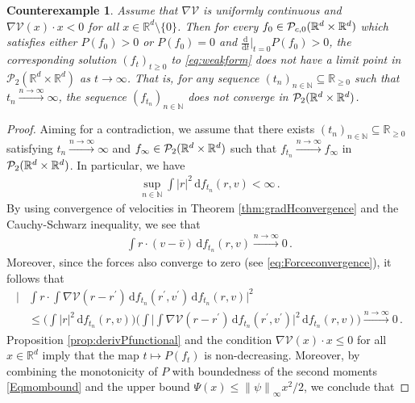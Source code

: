 \documentclass[11pt]{article}
\newtheorem*{counterexample*}{Counterexample}
\newcommand{\R}[0]{\mathbb R}
\newcommand{\N}[0]{\mathbb N}
\newcommand{\norm}[1]{\left\| #1 \right\|}
\newcommand{\abs}[1]{\left| #1 \right|}
\newcommand{\Ppo}[1]{
    \ifx #1\infty
        \mathcal{P}_{c,0}
    \else 
        \mathcal{P}_{#1,0}
    \fi 
}
\newcommand{\Pp}[1]{
    \ifx #1\infty
        \mathcal{P}_{c}
    \else 
        \mathcal{P}_{#1}
    \fi 
}
\newcommand{\msolt}[2]{f_{#1}(#2)}
\newcommand{\Pfunc}{P}
\begin{document}
\begin{bibunit}[unsrtnat]
\begin{counterexample*}
        Assume that $\nabla \mathcal{V}$ is uniformly continuous and $\nabla \mathcal{V}(x) \cdot x < 0$ for all $x \in \R^d\setminus\{ 0 \}$. Then for every $f_0 \in \Ppo{\infty} (\R^d \times \R^d)$ which satisfies either $P(f_0) > 0$ or $P(f_0) = 0$ and $\frac{\mathrm{d}}{\mathrm{d}t} \Big|_{t = 0} P(f_0) > 0$, the corresponding solution $(f_t )_{t \geq 0}$ to \eqref{eq:weakform} does not have a limit point in $\mathcal{P}_2(\R^d \times \R^d)$ as $t \to \infty$. That is, for any sequence $(t_n)_{n \in \N} \subseteq \R_{\geq 0} $ such that $t_n \stackrel{n \to \infty}{\to} \infty$, the sequence $(f_{t_n})_{n \in \N}$ does not converge in $\Pp{2}(\R^d \times \R^d)$.
    \end{counterexample*}
    \begin{proof}
        Aiming for a contradiction, we assume that there exists $(t_n)_{n \in \N} \subseteq \R_{\geq 0}$ satisfying $t_n \stackrel{n \to \infty}{\to} \infty $ and $f_\infty \in \Pp{2}(\R^d \times \R^d)$ such that $f_{t_n} \stackrel{n \to \infty}{\to} f_\infty$ in $\Pp{2}(\R^d \times \R^d)$. In particular, we have 
        \begin{align}
            \sup_{n \in \N} \int  \abs{r}^{2} \, \mathrm{d} \msolt{t_n}{r,v} < \infty \, . \label{Eqmombound}
        \end{align}
        By using convergence of velocities in Theorem \ref{thm:gradHconvergence} and the Cauchy-Schwarz inequality, we see that 
        \begin{align*}
            \int r \cdot (v-\bar{v}) \, \mathrm{d}\msolt{t_n} {r,v} \stackrel{n \to \infty}{\to} 0 \, .
        \end{align*}
        Moreover, since the forces also converge to zero (see \eqref{eq:Forceconvergence}), it follows that 
        \begin{align}
            \Big| &\int r \cdot \int \nabla \mathcal{V}(r-r^\prime) \, \mathrm{d}\msolt{t_n}{r^\prime, v^\prime} \, \mathrm{d}\msolt{t_n}{r,v} \Big|^{2} \nonumber \\
            &\leq \Big( \int \abs{r}^{2} \, \mathrm{d}\msolt{t_n}{r,v} \Big) \Big( \int \Big| \int \nabla \mathcal{V}(r-r^\prime) \, \mathrm{d}\msolt{t_n}{r^\prime,v^\prime} \Big|^{2} \, \mathrm{d}\msolt{t_n}{r,v}\Big) \stackrel{n \to \infty }{\to} 0 \, . \label{EqVirialconv}
        \end{align}
        Proposition \ref{prop:derivPfunctional} and the condition $\nabla \mathcal{V}(x) \cdot x \leq 0$ for all $x \in \R^d$ imply that the map  $t \mapsto \Pfunc (f_t)$ is non-decreasing. Moreover, by combining the monotonicity of $\Pfunc$ with boundedness of the second moments \eqref{Eqmombound} and the upper bound $\Psi (x) \leq \norm{\psi}_\infty x^2/{2}$, we conclude that 

\end{proof}
\end{bibunit}
\end{document}
